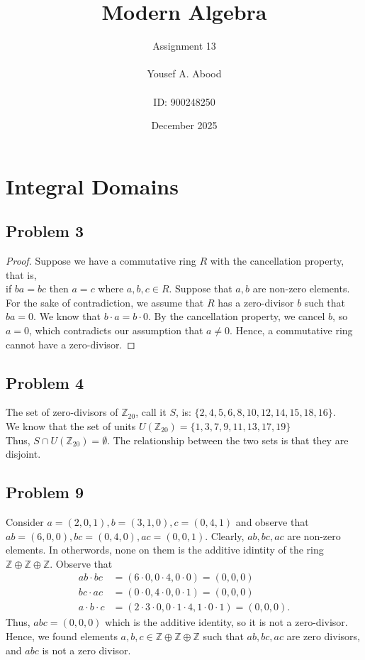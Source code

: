 \documentclass[a4paper,12pt]{article}
\title{Modern Algebra}
\author{Assignment 13\\ \\ Yousef A. Abood\\ \\ ID: 900248250}
\date{December 2025}
\begin{document}
\maketitle
\noindent\makebox[\linewidth]{\rule{15cm}{0.4pt}}
\section{Integral Domains}
\subsection*{Problem 3}
%  
\begin{proof}
    Suppose we have a commutative ring $R$ with the cancellation property, that is,\\ if $ba=bc$ then $a=c$ where $a,b,c \in R$. Suppose that $a,b$ are non-zero elements. For the sake of contradiction, we assume that $R$ has a zero-divisor $b$ such that $ba=0.$ 
    We know that $b\cdot a=b\cdot 0$. By the cancellation property, we cancel $b$, so $a = 0$, which contradicts our assumption that $a \ne 0$. Hence, a commutative ring cannot have a zero-divisor.
\end{proof}
\subsection*{Problem 4}
The set of zero-divisors of $\mathbb{Z}_{20}$, call it $S$, is: $\{2,4,5,6,8,10,12,14,15,18,16\}$.\\
We know that the set of units $U(\mathbb{Z}_{20})=\{1,3,7,9,11,13,17,19\}$
\\ Thus, $S \cap U(\mathbb{Z}_{20})=\emptyset.$ The relationship between the two sets is that they are disjoint.
\subsection*{Problem 9}
Consider $a=(2,0,1), b=(3,1,0), c=(0,4,1)$ and observe that $ab=(6,0,0), bc=(0,4,0), ac=(0,0,1)$. Clearly, $ab,bc,ac$ are non-zero elements. In otherwords, none on them is the additive idintity of the ring $\mathbb{Z} \oplus \mathbb{Z}\oplus \mathbb{Z}.$ Observe that 
\begin{align*}
    ab \cdot bc &= (6 \cdot 0, 0 \cdot 4, 0 \cdot 0)=(0,0,0)\\
    bc\cdot ac &= (0 \cdot 0, 4 \cdot 0, 0 \cdot 1)=(0,0,0)\\
    a \cdot b \cdot c &=(2 \cdot 3 \cdot 0, 0 \cdot 1 \cdot 4, 1 \cdot 0 \cdot 1)=(0,0,0).
\end{align*}
Thus, $abc=(0,0,0)$ which is the additive identity, so it is not a zero-divisor. Hence, we found elements $a,b,c \in \mathbb{Z} \oplus \mathbb{Z}\oplus \mathbb{Z}$ such that $ab,bc,ac$ are zero divisors, and $abc$ is not a zero divisor.
\end{document}
